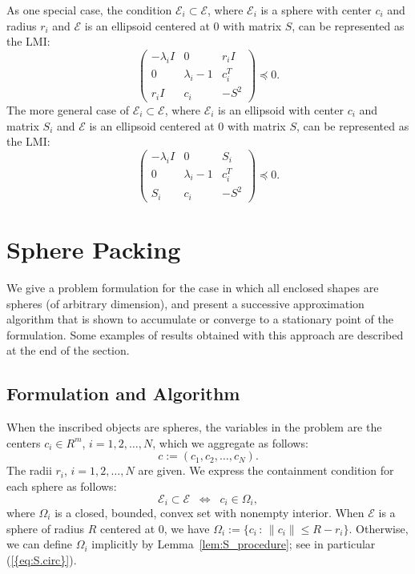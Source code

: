 \documentclass{siamltex}
\begin{document}
As one special case, the condition $\mathcal{E}_i \subset
\mathcal{E}$, where $\mathcal{E}_i$ is a sphere with center $c_i$ and
radius $r_i$ and $\mathcal{E}$ is an ellipsoid centered at $0$ with
matrix $S$, can be represented as the LMI:
\begin{equation} \label{eq:S.circ}
\begin{pmatrix} - \lambda_i I &0&r_i I\\0& \lambda_i-1&c_i^T\\ r_i I&c_i&-S^2\end{pmatrix}\preceq 0.
\end{equation}
The more general case of $\mathcal{E}_i \subset \mathcal{E}$, where
$\mathcal{E}_i$ is an ellipsoid with center $c_i$ and matrix $S_i$ and
$\mathcal{E}$ is an ellipsoid centered at $0$ with matrix $S$, can be
represented as the LMI:
\begin{equation} \label{eq:S.ell}
\begin{pmatrix} - \lambda_i I &0&S_i \\0& \lambda_i-1&c_i^T\\ S_i &c_i &-S^2 \end{pmatrix}\preceq 0.
\end{equation}

\section{Sphere Packing} \label{sec:sphere}

We give a problem formulation for the case in which all enclosed
shapes are spheres (of arbitrary dimension), and present a successive
approximation algorithm that is shown to accumulate or converge to a
stationary point of the formulation. Some examples of results obtained
with this approach are described at the end of the section.

\subsection{Formulation and Algorithm} \label{sec:sphere:alg}

When the inscribed objects are spheres, the variables in the problem
are the centers $c_i \in R^m$, $i=1,2,\dots ,N$, which we
aggregate as follows:
\begin{equation} \label{eq:defc}
c := (c_1,c_2, \dotsc,c_N).
\end{equation}
The radii $r_i$, $i=1,2,\dotsc,N$ are given.  We express the
containment condition for each sphere as follows:
\begin{equation} \label{eq:defOmi}
\mathcal{E}_i \subset \mathcal{E}  \;\; \Leftrightarrow \;\;
c_i \in \Omega_i,
\end{equation}
where $\Omega_i$ is a closed, bounded, convex set with nonempty
interior. When $\mathcal{E}$ is a sphere of radius $R$ centered at
$0$, we have $\Omega_i := \{ c_i \, : \, \|c_i \| \le
R-r_i\}$. Otherwise, we can define $\Omega_i$ implicitly by
Lemma~\ref{lem:S_procedure}; see in particular {(\ref{{eq:S.circ}})}.
\end{document}
